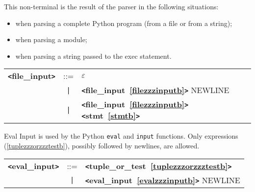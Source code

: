 
\label{filezzzinputb}
This non-terminal is the result of the parser in the following situations:
\begin{itemize}
\item when parsing a complete Python program (from a file or from a string);
\item when parsing a module;
\item when parsing a string passed to the exec statement.
\end{itemize}

\begin{tabular}{lcl}
{\bf \verb+<+file\_input\verb+>+} & ::=  & $\varepsilon$ \\
 & \verb+|+  & {\bf \verb+<+file\_input~\ref{filezzzinputb}\verb+>+}  NEWLINE \\
 & \verb+|+  & {\bf \verb+<+file\_input~\ref{filezzzinputb}\verb+>+}  {\bf \verb+<+stmt~\ref{stmtb}\verb+>+}  \\
\end{tabular}

\label{evalzzzinputb}
Eval Input is used by the Python \verb+eval+ and \verb+input+ functions.  Only expressions (\ref{tuplezzzorzzztestb}), possibly followed by newlines, are allowed. \\

\begin{tabular}{lcl}
{\bf \verb+<+eval\_input\verb+>+} & ::=  & {\bf \verb+<+tuple\_or\_test~\ref{tuplezzzorzzztestb}\verb+>+}  \\
 & \verb+|+  & {\bf \verb+<+eval\_input~\ref{evalzzzinputb}\verb+>+}  NEWLINE \\
\end{tabular}

